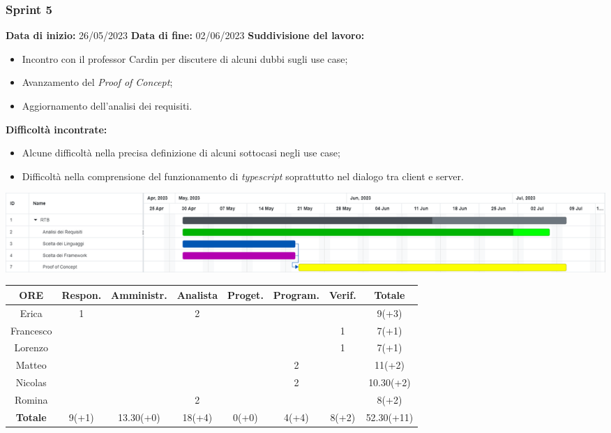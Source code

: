 \documentclass[a4paper, 12pt]{article}
\begin{document}
\subsubsection{Sprint 5}
\textbf{Data di inizio:} 26/05/2023\newline
\textbf{Data di fine:} 02/06/2023\newline
\newline
\textbf{Suddivisione del lavoro:}
\begin{itemize}
    \item Incontro con il professor Cardin per discutere di alcuni dubbi sugli use case;
    \item Avanzamento del \textit{Proof of Concept};
    \item Aggiornamento dell'analisi dei requisiti.
\end{itemize}
\textbf{Difficoltà incontrate:}
\begin{itemize}
    \item Alcune difficoltà nella precisa definizione di alcuni sottocasi negli use case;
    \item Difficoltà nella comprensione del funzionamento di \textit{typescript} soprattutto nel dialogo tra client e server.
\end{itemize}
\includegraphics[scale=0.24]{RTB_4.png}\newline
\newline
\begin{tabular}{|c|c|c|c|c|c|c|c|}
    \hline
    \textbf{ORE} & \textbf{Respon.} & \textbf{Amministr.} & \textbf{Analista} & \textbf{Proget.} & \textbf{Program.} & \textbf{Verif.} & \textbf{Totale}\\
    \hline
    Erica & 1 & & 2 & & & & 9(+3)\\
    \hline
    Francesco & & & & & & 1 & 7(+1)\\
    \hline
    Lorenzo & & & & & & 1 & 7(+1)\\
    \hline
    Matteo & & & & & 2 & & 11(+2)\\
    \hline
    Nicolas & & & & & 2 & & 10.30(+2)\\
    \hline
    Romina & & & 2 & & & & 8(+2)\\
    \hline
    \textbf{Totale} & 9(+1) & 13.30(+0) & 18(+4) & 0(+0) & 4(+4) & 8(+2) & 52.30(+11)\\
    \hline
\end{tabular}\\[8pt]
\end{document}

